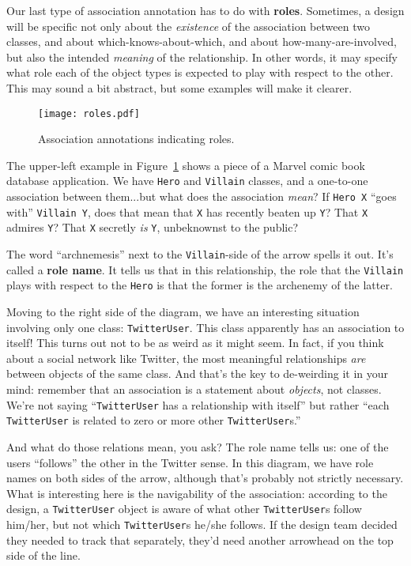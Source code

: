 Our last type of association annotation has to do with \textbf{roles}.
Sometimes, a design will be specific not only about the \textit{existence} of
the association between two classes, and about which-knows-about-which, and
about how-many-are-involved, but also the intended \textit{meaning} of the
relationship. In other words, it may specify what role each of the object
types is expected to play with respect to the other. This may sound a bit
abstract, but some examples will make it clearer.

\begin{figure}[ht]
\centering
\texttt{[image: roles.pdf]}   %
\caption{Association annotations indicating roles.}
\label{fig:roles}
\end{figure}

The upper-left example in Figure~\ref{fig:roles} shows a piece of a Marvel
comic book database application. We have \texttt{Hero} and \texttt{Villain}
classes, and a one-to-one association between them...but what does the
association \textit{mean}? If \texttt{Hero X} ``goes with'' \texttt{Villain Y},
does that mean that \texttt{X} has recently beaten up \texttt{Y}? That
\texttt{X} admires \texttt{Y}? That \texttt{X} secretly \textit{is}
\texttt{Y}, unbeknownst to the public?

The word ``archnemesis'' next to the \texttt{Villain}-side of the arrow spells
it out. It's called a \textbf{role name}. It tells us that in this
relationship, the role that the \texttt{Villain} plays with respect to the
\texttt{Hero} is that the former is the archenemy of the latter.

Moving to the right side of the diagram, we have an interesting situation
involving only one class: \texttt{TwitterUser}. This class apparently has an
association to itself! This turns out not to be as weird as it might seem. In
fact, if you think about a social network like Twitter, the most meaningful
relationships \textit{are} between objects of the same class. And that's the
key to de-weirding it in your mind: remember that an association is a
statement about \textit{objects}, not classes. We're not saying
``\texttt{TwitterUser} has a relationship with itself'' but rather ``each
\texttt{TwitterUser} is related to zero or more other \texttt{TwitterUser}s.''

And what do those relations mean, you ask? The role name tells us: one of the
users ``follows'' the other in the Twitter sense. In this diagram, we have role
names on both sides of the arrow, although that's probably not strictly
necessary. What is interesting here is the navigability of the association:
according to the design, a \texttt{TwitterUser} object is aware of what other
\texttt{TwitterUser}s follow him/her, but not which \texttt{TwitterUser}s
he/she follows. If the design team decided they needed to track that
separately, they'd need another arrowhead on the top side of the line.


